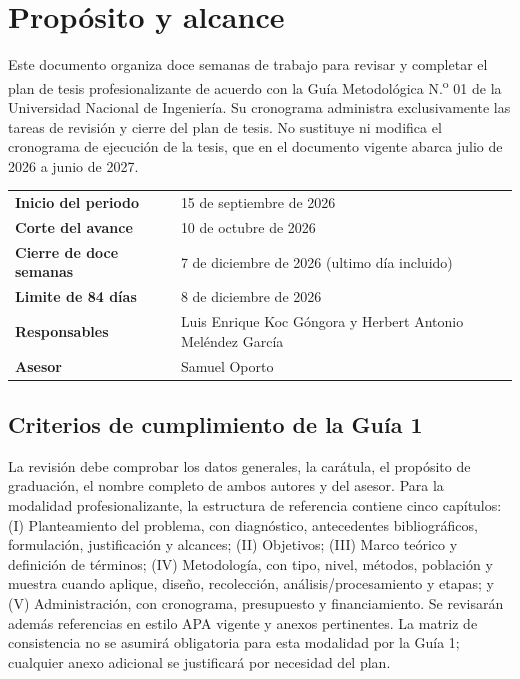\documentclass[11pt,a4paper,oneside]{report}
\begin{document}

\chapter*{Prop\'osito y alcance}
Este documento organiza doce semanas de trabajo para revisar y completar el plan de tesis profesionalizante de acuerdo con la Gu\'ia Metodol\'ogica N.\textsuperscript{o} 01 de la Universidad Nacional de Ingenier\'ia. Su cronograma administra exclusivamente las tareas de revisi\'on y cierre del plan de tesis. No sustituye ni modifica el cronograma de ejecuci\'on de la tesis, que en el documento vigente abarca julio de 2026 a junio de 2027.

\begin{tabularx}{\textwidth}{>{\bfseries}p{4.4cm}X}
Inicio del periodo & 15 de septiembre de 2026 \\
Corte del avance & 10 de octubre de 2026 \\
Cierre de doce semanas & 7 de diciembre de 2026 (ultimo d\'ia incluido) \\
Limite de 84 d\'ias & 8 de diciembre de 2026 \\
Responsables & Luis Enrique Koc G\'ongora y Herbert Antonio Mel\'endez Garc\'ia \\
Asesor & Samuel Oporto \\
\end{tabularx}

\section*{Criterios de cumplimiento de la Gu\'ia 1}
La revisi\'on debe comprobar los datos generales, la car\'atula, el prop\'osito de graduaci\'on, el nombre completo de ambos autores y del asesor. Para la modalidad profesionalizante, la estructura de referencia contiene cinco cap\'itulos: (I) Planteamiento del problema, con diagn\'ostico, antecedentes bibliogr\'aficos, formulaci\'on, justificaci\'on y alcances; (II) Objetivos; (III) Marco te\'orico y definici\'on de t\'erminos; (IV) Metodolog\'ia, con tipo, nivel, m\'etodos, poblaci\'on y muestra cuando aplique, dise\~no, recolecci\'on, an\'alisis/procesamiento y etapas; y (V) Administraci\'on, con cronograma, presupuesto y financiamiento. Se revisar\'an adem\'as referencias en estilo APA vigente y anexos pertinentes. La matriz de consistencia no se asumir\'a obligatoria para esta modalidad por la Gu\'ia 1; cualquier anexo adicional se justificar\'a por necesidad del plan.
\end{document}
